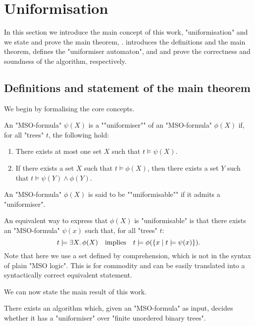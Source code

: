 \documentclass[a4paper,UKenglish,cleveref, autoref, thm-restate]{lipics-v2021}
\begin{document}
\section{Uniformisation}\label{sec:uniformisation}
In this section we introduce the main concept of this work, "uniformisation" and we state and prove the main theorem, .
 introduces the definitions and the main theorem,  defines the "uniformiser automaton",
and  and  prove the correctness and soundness of the algorithm, respectively.

\subsection{Definitions and statement of the main theorem}\label{section:uniformisation-definitions}

We begin by formalising the core concepts.

\begin{definition}\label{def:uniformiser}
	\AP An "MSO-formula" $\psi(X)$ is a ""uniformiser"" of an "MSO-formula" $\phi(X)$ if, for all "trees" $t$, the following hold:
	\begin{enumerate}
		\item There exists at most one set $X$ such that $t \models \psi(X)$.
		\item If there exists a set $X$ such that $t \models \phi(X)$, then there exists a set $Y$ such that $t \models \psi(Y) \land \phi(Y)$.
	\end{enumerate}
	\AP An "MSO-formula" $\phi(X)$ is said to be ""uniformisable"" if it admits a "uniformiser".
\end{definition}

\begin{remark}\label{remark:uniformisability}
	An equivalent way to express that $\phi(X)$ is "uniformisable" is that there exists an "MSO-formula" $\psi(x)$ such that, for all "trees" $t$:
	\[
		t \models \exists X.\, \phi(X) \quad \text{implies} \quad t \models \phi(\left\{x \mid t \models \psi(x)\right\}).
	\]
	Note that here we use a set defined by comprehension, which is not in the syntax of plain "MSO logic".
	This is for commodity and can be easily translated into a syntactically correct equivalent statement.
\end{remark}

We can now state the main result of this work.
\begin{theorem} \label{thm:uniformisability-decision}\label{theorem:main}
	There exists an algorithm which, given an "MSO-formula" as input, decides whether it has a "uniformiser" over "finite unordered binary trees".
\end{theorem}
\end{document}

